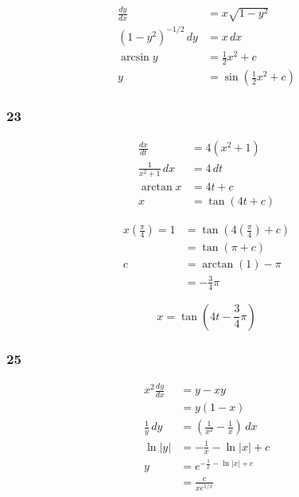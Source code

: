 \documentclass{article}
\begin{document}
\begin{align*}
  \frac{d y}{d x}          & = x \sqrt{1 - y^2}                        \\
  (1 - y^2)^{-1 / 2} \,d y & = x \,d x                                 \\
  \arcsin y                & = \frac{1}{2} x^2 + c                     \\
  y                        & = \sin \left( \frac{1}{2} x^2 + c \right)
\end{align*}

\subsubsection{23}

\begin{align*}
  \frac{d x}{d t}         & = 4 (x^2 + 1)    \\
  \frac{1}{x^2 + 1} \,d x & = 4 \,d t        \\
  \arctan x               & = 4 t + c        \\
  x                       & = \tan (4 t + c)
\end{align*}

\begin{align*}
  x \left( \frac{\pi}{4} \right) = 1 & = \tan \left( 4 \left( \frac{\pi}{4} \right) + c \right) \\
                                     & =\tan (\pi + c)                                          \\
  c                                  & = \arctan (1) - \pi                                      \\
                                     & = -\frac{3}{4} \pi
\end{align*}

\[x = \tan \left( 4 t - \frac{3}{4} \pi \right)\]

\subsubsection{25}

\begin{align*}
  x^2 \frac{d y}{d x} & = y - x y                                          \\
                      & = y (1 - x)                                        \\
  \frac{1}{y} \,d y   & = \left( \frac{1}{x^2} - \frac{1}{x} \right) \,d x \\
  \ln |y|             & = -\frac{1}{x} - \ln |x| + c                       \\
  y                   & = e^{-\frac{1}{x} - \ln |x| + c}                   \\
                      & = \frac{c}{x e^{1 / x}}
\end{align*}
\end{document}
